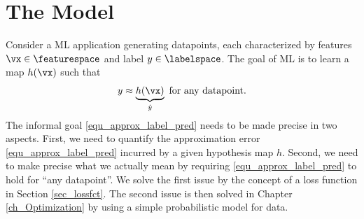 \documentclass[12pt]{report}
\begin{document}
\section{The Model}
\label{sec_hypo_space}

%

Consider a ML application generating datapoints, each characterized 
by features $\vx \in \featurespace$ and label $y \in \labelspace$. The goal 
of ML is to learn a map $h(\vx)$ such that 
\begin{equation} 
\label{equ_approx_label_pred}
y \approx \underbrace{h(\vx)}_{\hat{y}} \mbox{ for any datapoint}. 
\end{equation}  
The informal goal \eqref{equ_approx_label_pred} needs to be made precise 
in two aspects. First, we need to quantify the approximation error \eqref{equ_approx_label_pred} 
incurred by a given hypothesis map $h$. Second, we need to make precise 
what we actually mean by requiring \eqref{equ_approx_label_pred} to hold 
for ``any datapoint''. We solve the first issue by the concept of a loss 
function in Section \ref{sec_lossfct}. The second issue is then solved 
in Chapter \ref{ch_Optimization} by using a simple probabilistic model 
for data. 


\end{document}
